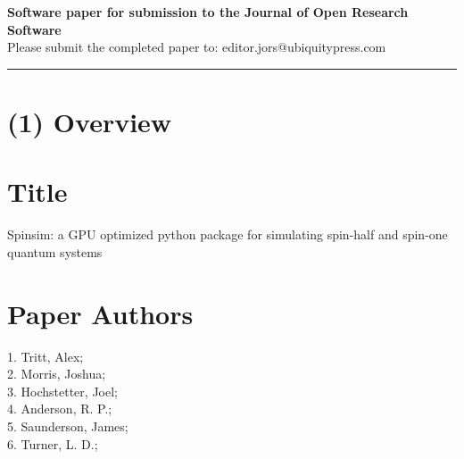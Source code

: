 \documentclass{jors}
\begin{document}
{\bf Software paper for submission to the Journal of Open Research Software} \\

Please submit the completed paper to: editor.jors@ubiquitypress.com

\rule{\textwidth}{1pt}

\section{(1) Overview}

\vspace{0.5cm}

\section{Title}
Spinsim: a GPU optimized python package for simulating spin-half and spin-one quantum systems 

\section{Paper Authors}
1. Tritt, Alex;\\
2. Morris, Joshua;\\
3. Hochstetter, Joel;\\
4. Anderson, R. P.;\\
5. Saunderson, James;\\
6. Turner, L. D.;\\
\end{document}
